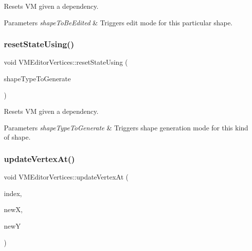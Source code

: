 Resets VM given a dependency. 


\begin{DoxyParams}{Parameters}
{\em shape\+To\+Be\+Edited} & Triggers edit mode for this particular shape. \\
\hline
\end{DoxyParams}
\mbox{\label{class_v_m_editor_vertices_abe3cb316fd9c1751b0163ab137c01148}} 
\subsubsection{\texorpdfstring{resetStateUsing()}{resetStateUsing()}\hspace{0.1cm}{\footnotesize\ttfamily [2/2]}}
{\footnotesize\ttfamily void V\+M\+Editor\+Vertices\+::reset\+State\+Using (\begin{DoxyParamCaption}\item[{\mbox{\hyperlink{class_i_shape_a8f50993477b5ddb44c0547ef3d547cdc}{I\+Shape\+::\+Shape\+Type}}}]{shape\+Type\+To\+Generate }\end{DoxyParamCaption})}



Resets VM given a dependency. 


\begin{DoxyParams}{Parameters}
{\em shape\+Type\+To\+Generate} & Triggers shape generation mode for this kind of shape. \\
\hline
\end{DoxyParams}
\mbox{\label{class_v_m_editor_vertices_addd6dff8c7d5a7d582d9b6cb4f677843}} 
\subsubsection{\texorpdfstring{updateVertexAt()}{updateVertexAt()}}
{\footnotesize\ttfamily void V\+M\+Editor\+Vertices\+::update\+Vertex\+At (\begin{DoxyParamCaption}\item[{int}]{index,  }\item[{Q\+String}]{newX,  }\item[{Q\+String}]{newY }\end{DoxyParamCaption})}




